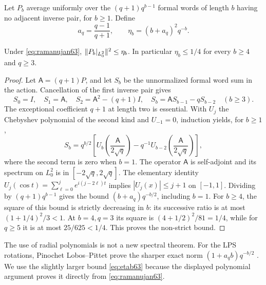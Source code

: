 Let $P_b$ average uniformly over the $(q+1)q^{b-1}$ formal words of
length $b$ having no adjacent inverse pair, for $b\ge1$. Define
\begin{equation}\label{eq:etab63}
 a_q=\frac{q-1}{q+1},\qquad
 \eta_b=(b+a_q)^2q^{-b}.
\end{equation}
\begin{lemma}\label{lem:radial63}
Under \eqref{eq:ramanujan63}, $\lVert P_b|_{L^2_0}\rVert^2\le\eta_b$.
In particular $\eta_b\le1/4$ for every $b\ge4$ and $q\ge3$.
\end{lemma}
\begin{proof}
Let $\mathsf A=(q+1)P$, and let $S_b$ be the unnormalized formal
word sum in the action. Cancellation of the first inverse pair gives
\[
 S_0=I,\quad S_1=\mathsf A,\quad
 S_2=\mathsf A^2-(q+1)I,\quad
 S_b=\mathsf A S_{b-1}-qS_{b-2}\quad(b\ge3).
\]
The exceptional coefficient $q+1$ at length two is essential.
With $U_j$ the Chebyshev polynomial of the second kind and
$U_{-1}=0$, induction yields, for $b\ge1$,
\[
 S_b=q^{b/2}\left[
 U_b\left(\frac{\mathsf A}{2\sqrt q}\right)
 -q^{-1}U_{b-2}\left(\frac{\mathsf A}{2\sqrt q}\right)\right],
\]
where the second term is zero when $b=1$.
The operator $\mathsf A$ is self-adjoint and its spectrum on $L^2_0$
is in $[-2\sqrt q,2\sqrt q]$. The elementary identity
$U_j(\cos t)=\sum_{\ell=0}^j e^{i(j-2\ell)t}$ implies
$|U_j(x)|\le j+1$ on $[-1,1]$.
Dividing by $(q+1)q^{b-1}$ gives the bound
$(b+a_q)q^{-b/2}$, including $b=1$.
For $b\ge4$, the square of this bound is strictly decreasing in $b$:
its successive ratio is at most
$(1+1/4)^2/3<1$. At $b=4,q=3$ its square is
$(4+1/2)^2/81=1/4$, while for $q\ge5$ it is at most
$25/625<1/4$. This proves the non-strict bound.
\end{proof}
The use of radial polynomials is not a new spectral theorem. For the
LPS rotations, Pinochet Lobos--Pittet prove the sharper exact norm
$(1+a_qb)q^{-b/2}$ \cite[Theorem~1.2]{PLP61pre}.
We use the slightly larger bound \eqref{eq:etab63} because the displayed
polynomial argument proves it directly from \eqref{eq:ramanujan63}.

